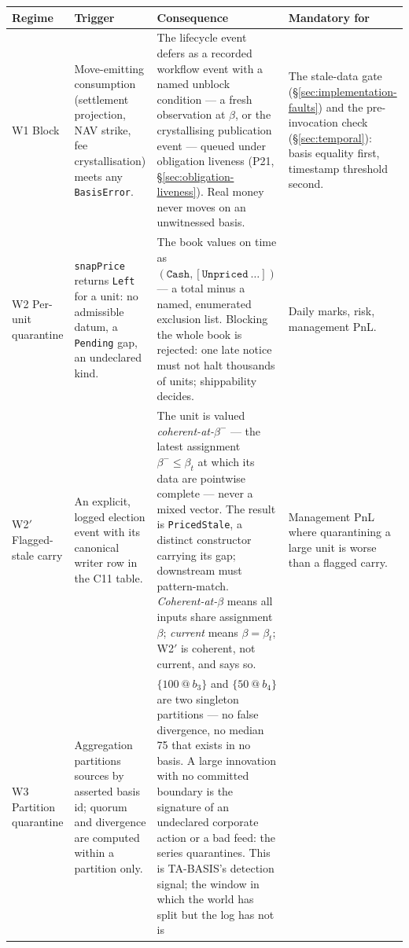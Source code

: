 \renewcommand{\arraystretch}{1.25}
\begin{center}
\begin{longtable}{@{}p{2.2cm} p{3.6cm} p{4.7cm} p{2.9cm}@{}}
\toprule
\textbf{Regime} & \textbf{Trigger} & \textbf{Consequence} & \textbf{Mandatory for} \\
\midrule
\endhead
W1 Block & Move-emitting consumption (settlement projection, NAV strike, fee
crystallisation) meets any \texttt{BasisError}. & The lifecycle event defers as a
recorded workflow event with a named unblock condition --- a fresh observation at
$\beta$, or the crystallising publication event --- queued under obligation liveness
(P21, \S\ref{sec:obligation-liveness}). Real money never moves on an unwitnessed basis.
& The stale-data gate (\S\ref{sec:implementation-faults}) and the pre-invocation check
(\S\ref{sec:temporal}): basis equality first, timestamp threshold second. \\
\addlinespace
W2 Per-unit quarantine & \texttt{snapPrice} returns \texttt{Left} for a unit: no
admissible datum, a \texttt{Pending} gap, an undeclared kind. & The book values on time
as $(\texttt{Cash},[\texttt{Unpriced}\ \dots])$ --- a total minus a named, enumerated
exclusion list. Blocking the whole book is rejected: one late notice must not halt
thousands of units; shippability decides. & Daily marks, risk, management PnL. \\
\addlinespace
W2$'$ Flagged-stale carry & An explicit, logged election event with its canonical
writer row in the C11 table. & The unit is valued \emph{coherent-at-}$\beta^-$ --- the
latest assignment $\beta^-\le\beta_t$ at which its data are pointwise complete --- never
a mixed vector. The result is \texttt{PricedStale}, a distinct constructor carrying its
gap; downstream must pattern-match. \emph{Coherent-at-}$\beta$ means all inputs share
assignment $\beta$; \emph{current} means $\beta=\beta_t$; W2$'$ is coherent, not
current, and says so. & Management PnL where quarantining a large unit is worse than a
flagged carry. \\
\addlinespace
W3 Partition quarantine & Aggregation partitions sources by asserted basis id;
quorum and divergence are computed within a partition only. & $\{100\ @\ b_3\}$ and
$\{50\ @\ b_4\}$ are two singleton partitions --- no false divergence, no median 75 that
exists in no basis. A large innovation with no committed boundary is the signature of an
undeclared corporate action or a bad feed: the series quarantines. This is TA-BASIS's
detection signal; the window in which the world has split but the log has not is

\end{longtable}
\end{center}

